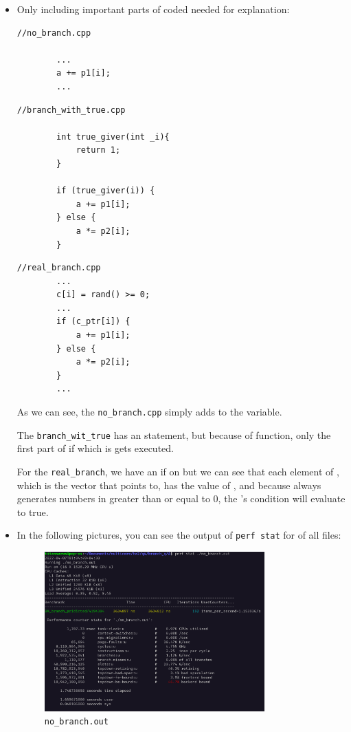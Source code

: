 \documentclass[12pt]{article}
\begin{document}
\begin{itemize}
	\item 
	Only including important parts of coded needed for explanation:
	\begin{lstlisting}[style=CStyle]
		//no_branch.cpp
		
		...
		a += p1[i];
		...
	\end{lstlisting}
	
	\begin{lstlisting}[style=CStyle]
		//branch_with_true.cpp
		
		int true_giver(int _i){
			return 1;
		}
		
		if (true_giver(i)) {
			a += p1[i];
		} else {
			a *= p2[i];
		}
	\end{lstlisting}
	
	\begin{lstlisting}[style=CStyle]
		//real_branch.cpp
		...
		c[i] = rand() >= 0;
		...
		if (c_ptr[i]) {
			a += p1[i];
		} else {
			a *= p2[i];
		}
		...
	\end{lstlisting}
	
	As we can see, the \Verb+no_branch.cpp+ simply adds  to the  variable. 
	
	The \Verb+branch_wit_true+ has an  statement, but because of  function, only the first part of if which is  gets executed. 
	
	For the \Verb+real_branch+, we have an if on  but we can see that each element of , which is the vector that  points to, has the value of , and because   always generates numbers in greater than or equal to $0$, the 's condition will evaluate to true.
	
	\item
	In the following pictures, you can see the output of \Verb+perf stat+ for of all files:
	
\begin{figure}[H]
	\centering
	\includegraphics[width=0.8\textwidth]{./images/4A/no-branch.png}	
	\cprotect\caption{\Verb+no_branch.out+}
\end{figure}




\end{itemize}
\end{document}
